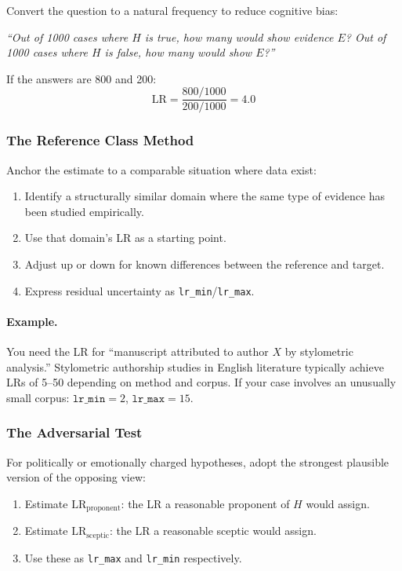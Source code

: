 \documentclass[11pt,a4paper]{article}
\begin{document}
Convert the question to a natural frequency to reduce cognitive bias:

\emph{``Out of 1000 cases where $H$ is true, how many would show evidence $E$?
Out of 1000 cases where $H$ is false, how many would show $E$?''}

If the answers are 800 and 200:
\[
\text{LR} = \frac{800/1000}{200/1000} = 4.0
\]

\subsubsection{The Reference Class Method}

Anchor the estimate to a comparable situation where data exist:

\begin{enumerate}
\item Identify a structurally similar domain where the same type of evidence
  has been studied empirically.
\item Use that domain's LR as a starting point.
\item Adjust up or down for known differences between the reference and target.
\item Express residual uncertainty as \texttt{lr\_min}/\texttt{lr\_max}.
\end{enumerate}

\paragraph{Example.} You need the LR for ``manuscript attributed to author $X$
by stylometric analysis.'' Stylometric authorship studies in English literature
typically achieve LRs of 5--50 depending on method and corpus. If your case
involves an unusually small corpus: $\texttt{lr\_min} = 2$,
$\texttt{lr\_max} = 15$.

\subsubsection{The Adversarial Test}

For politically or emotionally charged hypotheses, adopt the strongest
plausible version of the opposing view:

\begin{enumerate}
\item Estimate $\text{LR}_{\text{proponent}}$: the LR a reasonable proponent
  of $H$ would assign.
\item Estimate $\text{LR}_{\text{sceptic}}$: the LR a reasonable sceptic
  would assign.
\item Use these as \texttt{lr\_max} and \texttt{lr\_min} respectively.
\end{enumerate}
\end{document}
